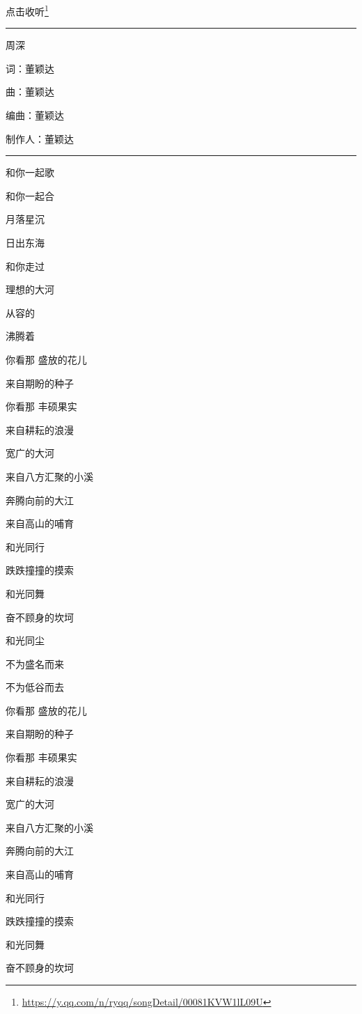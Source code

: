 \documentclass[]{ctexbook}
\renewcommand{\href}[2]{#2\footnote{\url{#1}}}
\begin{document}
\href{https://y.qq.com/n/ryqq/songDetail/00081KVW1lL09U}{点击收听}

\begin{center}\rule{0.5\linewidth}{0.5pt}\end{center}

周深

词：董颖达

曲：董颖达

编曲：董颖达

制作人：董颖达

\begin{center}\rule{0.5\linewidth}{0.5pt}\end{center}

和你一起歌

和你一起合

月落星沉

日出东海

和你走过

理想的大河

从容的

沸腾着

你看那 盛放的花儿

来自期盼的种子

你看那 丰硕果实

来自耕耘的浪漫

宽广的大河

来自八方汇聚的小溪

奔腾向前的大江

来自高山的哺育

和光同行

跌跌撞撞的摸索

和光同舞

奋不顾身的坎坷

和光同尘

不为盛名而来

不为低谷而去

你看那 盛放的花儿

来自期盼的种子

你看那 丰硕果实

来自耕耘的浪漫

宽广的大河

来自八方汇聚的小溪

奔腾向前的大江

来自高山的哺育

和光同行

跌跌撞撞的摸索

和光同舞

奋不顾身的坎坷
\end{document}
